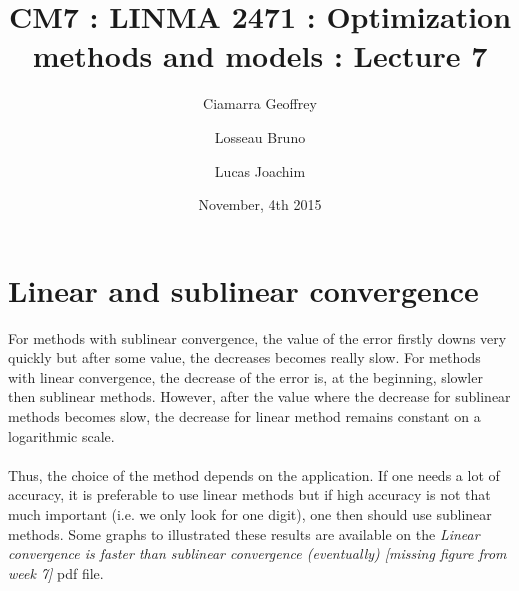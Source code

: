 \documentclass[10pt,a4paper]{article}
\title{CM7 : LINMA 2471 : Optimization methods and models : Lecture 7}
\date{November, 4th 2015}
\author{Ciamarra Geoffrey \and Losseau Bruno \and Lucas Joachim}
\begin{document}
\maketitle
{}
\theoremstyle{plain}
\newtheorem{theorem}{Theorem}[section] %
\newtheorem{definition}{Definition}[section] %
\newtheorem{example}{Example}[section] %

\newtheorem{proposition}{Proposition}[section]
\newtheorem{corollary}{Corollary}[section]
\newtheorem{remark}{Remark}[section]




\section{Linear and sublinear convergence}
 For methods with sublinear convergence, the value of the error firstly downs very quickly but after some value, the decreases becomes really slow. For methods with linear convergence, the decrease of the error is, at the beginning, slowler then sublinear methods. However, after the value where the decrease for sublinear methods becomes slow, the decrease for linear method remains constant on a logarithmic scale. \\ \\ Thus, the choice of the method depends on the application. If one needs a lot of accuracy, it is preferable to use linear methods but if high accuracy is not that much important (i.e. we only look for one digit), one then should use sublinear methods. Some graphs to illustrated these results are available on the \textit{Linear convergence is faster than sublinear convergence (eventually) [missing figure from week 7]} pdf file.  
\end{document}
